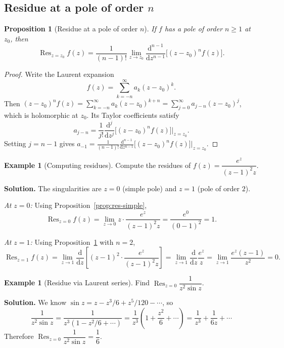 \documentclass[12pt,a4paper,openany]{book}
\theoremstyle{definition}
\newtheorem{example}[definition]{Example}
\theoremstyle{plain}
\newtheorem{proposition}[definition]{Proposition}
\theoremstyle{remark}
\DeclareMathOperator{\Res}{Res}
\newcommand{\dd}{\mathrm{d}}
\begin{document}
\subsection{Residue at a pole of order \texorpdfstring{$n$}{n}}

\begin{proposition}[Residue at a pole of order $n$]\label{prop:res-order-n}
If $f$ has a pole of order $n\geq 1$ at $z_0$, then
\[
  \Res_{z=z_0}f(z)
  =\frac{1}{(n-1)!}\lim_{z\to z_0}
    \frac{\dd^{n-1}}{\dd z^{n-1}}\bigl[(z-z_0)^n f(z)\bigr].
\]
\end{proposition}

\begin{proof}
Write the Laurent expansion
\[
  f(z)=\sum_{k=-n}^{\infty}a_k(z-z_0)^k.
\]
Then $(z-z_0)^n f(z)=\sum_{k=-n}^{\infty}a_k(z-z_0)^{k+n}
=\sum_{j=0}^{\infty}a_{j-n}(z-z_0)^j$, which is holomorphic at $z_0$.
Its Taylor coefficients satisfy
\[
  a_{j-n}=\frac{1}{j!}\frac{\dd^{j}}{\dd z^{j}}
    \bigl[(z-z_0)^n f(z)\bigr]\bigg|_{z=z_0}.
\]
Setting $j=n-1$ gives $a_{-1}=\frac{1}{(n-1)!}
\frac{\dd^{n-1}}{\dd z^{n-1}}\bigl[(z-z_0)^n f(z)\bigr]\big|_{z=z_0}$.
\end{proof}

\begin{example}[Computing residues]\label{ex:res-compute-1}
Compute the residues of $f(z)=\dfrac{e^z}{(z-1)^2 z}$.

\medskip\noindent\textbf{Solution.}
The singularities are $z=0$ (simple pole) and $z=1$ (pole of order $2$).

\emph{At $z=0$:} Using Proposition~\ref{prop:res-simple},
\[
  \Res_{z=0}f(z)=\lim_{z\to 0}z\cdot\frac{e^z}{(z-1)^2 z}
  =\frac{e^0}{(0-1)^2}=1.
\]

\emph{At $z=1$:} Using Proposition~\ref{prop:res-order-n} with $n=2$,
\[
  \Res_{z=1}f(z)=\lim_{z\to 1}\frac{\dd}{\dd z}\left[(z-1)^2\cdot
  \frac{e^z}{(z-1)^2 z}\right]
  =\lim_{z\to 1}\frac{\dd}{\dd z}\frac{e^z}{z}
  =\lim_{z\to 1}\frac{e^z(z-1)}{z^2}=0.
\]
\end{example}

\begin{example}[Residue via Laurent series]\label{ex:res-laurent}
Find $\Res_{z=0}\dfrac{1}{z^2\sin z}$.

\medskip\noindent\textbf{Solution.}
We know $\sin z=z-z^3/6+z^5/120-\cdots$, so
\[
  \frac{1}{z^2\sin z}=\frac{1}{z^3(1-z^2/6+\cdots)}
  =\frac{1}{z^3}\left(1+\frac{z^2}{6}+\cdots\right)
  =\frac{1}{z^3}+\frac{1}{6z}+\cdots
\]
Therefore $\Res_{z=0}\dfrac{1}{z^2\sin z}=\dfrac{1}{6}$.
\end{example}
\end{document}
